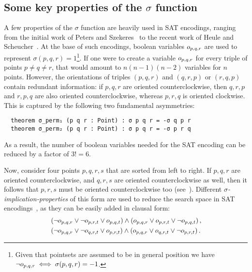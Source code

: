 \subsection{Some key properties of the $\sigma$ function}
A few properties of the $\sigma$ function are heavily used in SAT encodings, ranging from the initial work of Peters and Szekeres~\cite{szekeres_peters_2006} to the recent work of Heule and Scheucher~\cite{emptyHexagonNumber}. At the base of such encodings, boolean variables $\orvar_{p,q,r}$ are used to represent $\sigma(p, q, r) = 1$\footnote{Given that pointsets are assumed to be in general position we have $\neg \orvar_{p,q,r} \iff \sigma(p, q, r) = -1$.}. If one were to create a variable $\orvar_{p,q,r}$ for every triple of points $p \neq q \neq r$, that would amount to $n(n-1)(n-2)$ variables for $n$ points. However, the orientations of triples $(p, q, r)$ and $(q, r, p)$ or $(r, q, p)$ contain redundant information: if $p,q,r$ are oriented counterclockwise, then $q,r,p$ and $r,p,q$ are also oriented counterclockwise, whereas $p,r,q$ is oriented clockwise. This is captured by the following two fundamental asymmetries:
\begin{lstlisting}
  theorem σ_perm₁ (p q r : Point) : σ p q r = -σ q p r
  theorem σ_perm₂ (p q r : Point) : σ p q r = -σ p r q
\end{lstlisting}
As a result, the number of boolean variables needed for the SAT encoding can be reduced by a factor of $3! = 6$.

Now, consider four points $p, q, r, s$ that are sorted from left to right. If $p, q, r$ are oriented counterclockwise, and $q, r, s$ are oriented counterclockwise as well, then it follows that $p, r, s$ must be oriented counterclockwise too (see~). Different \emph{$\sigma$-implication-properties} of this form are used to reduce the search space in SAT encodings~\cite{emptyHexagonNumber,scheucherTwoDisjoint5holes2020,subercaseaux2023minimizing, szekeres_peters_2006}, as they can be easily added in clausal form:
\begin{align}
  &\left(\neg \orvar_{p, q, r} \lor \neg \orvar_{p, r, t} \lor \orvar_{p, q, t}\right) \land \left(\orvar_{p, q, r} \lor \orvar_{p, r, t} \lor  \neg \orvar_{p, q, t}\right), \\
  &\left(\neg \orvar_{p, q, r} \lor \neg \orvar_{q, r, t} \lor  \orvar_{p, r, t}\right) \land \left(\orvar_{p, q, r} \lor \orvar_{q, r, t} \lor  \neg \orvar_{p, r, t}\right).
\end{align}

